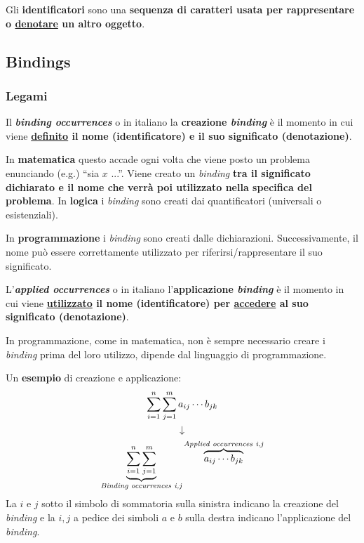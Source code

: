 \documentclass[a4paper]{article}
\newcommand{\dquotes}[1]{``#1''}
\begin{document}
	\noindent
	\begin{boxdef}
		Gli \textcolor{Red3}{\textbf{identificatori}} sono una \textbf{sequenza di caratteri usata per rappresentare o \underline{denotare} un altro oggetto}.
	\end{boxdef}\newpage
	
	\subsection{Bindings}
	
	\subsubsection{Legami}
	
	\begin{boxdef}
		Il \textcolor{Red3}{\textbf{\emph{binding occurrences}}} o in italiano la \textcolor{Red3}{\textbf{creazione \emph{binding}}} è il momento in cui viene \textbf{\underline{definito} il nome (identificatore) e il suo significato (denotazione)}.
	\end{boxdef}

	\noindent
	In \textbf{matematica} questo accade ogni volta che viene posto un problema enunciando (e.g.) \dquotes{sia $x$ ...}. Viene creato un \emph{binding} \textbf{tra il significato dichiarato e il nome che verrà poi utilizzato nella specifica del problema}. In \textbf{logica} i \emph{binding} sono creati dai quantificatori (universali o esistenziali).\newline
	
	\noindent
	In \textbf{programmazione} i \emph{binding} sono creati dalle dichiarazioni. Successivamente, il nome può essere correttamente utilizzato per riferirsi/rappresentare il suo significato.\newline
	
	\noindent
	\begin{boxdef}
		L'\textcolor{Red3}{\textbf{\emph{applied occurrences}}} o in italiano l'\textcolor{Red3}{\textbf{applicazione \emph{binding}}} è il momento in cui viene \textbf{\underline{utilizzato} il nome (identificatore) per \underline{accedere} al suo significato (denotazione)}.
	\end{boxdef}

	\noindent
	In programmazione, come in matematica, non è sempre necessario creare i \emph{binding} prima del loro utilizzo, dipende dal linguaggio di programmazione.\newline
	
	\noindent
	Un \textcolor{Green4}{\textbf{esempio}} di creazione e applicazione:
	\begin{gather*}
		\displaystyle\sum_{i=1}^{n}\sum_{j=1}^{m}a_{ij} \cdots b_{jk} \\
		\downarrow \\
		\displaystyle\underbrace{\sum_{i=1}^{n}\sum_{j=1}^{m}}_{\text{\emph{Binding occurrences i,j}}} \overbrace{a_{ij} \cdots b_{jk}}^{\text{\emph{Applied occurrences i,j}}}
	\end{gather*}
	La $i$ e $j$ sotto il simbolo di sommatoria sulla sinistra indicano la creazione del \emph{binding} e la $i,j$ a pedice dei simboli $a$ e $b$ sulla destra indicano l'applicazione del \emph{binding}.\newpage
	
\end{document}
